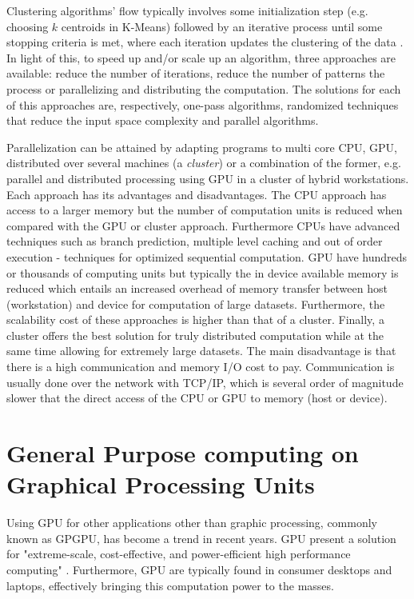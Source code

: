 Clustering algorithms' flow typically involves some initialization step (e.g. choosing $k$ centroids in K-Means) followed by an iterative process until some stopping criteria is met, where each iteration updates the clustering of the data \cite{Aggarwal2014}. In light of this, to speed up and/or scale up an algorithm, three approaches are available: reduce the number of iterations, reduce the number of patterns the process or parallelizing and distributing the computation. The solutions for each of this approaches are, respectively, one-pass algorithms, randomized techniques that reduce the input space complexity and parallel algorithms.

Parallelization can be attained by adapting programs to multi core CPU, GPU, distributed over several machines (a \emph{cluster}) or a combination of the former, e.g. parallel and distributed processing using GPU in a cluster of hybrid workstations.
Each approach has its advantages and disadvantages.
The CPU approach has access to a larger memory but the number of computation units is reduced when compared with the GPU or cluster approach. Furthermore CPUs have advanced techniques such as branch prediction, multiple level caching and out of order execution - techniques for optimized sequential computation.
GPU have hundreds or thousands of computing units but typically the in device available memory is reduced which entails an increased overhead of memory transfer between host (workstation) and device for computation of large datasets.
Furthermore, the scalability cost of these approaches is higher than that of a cluster.
Finally, a cluster offers the best solution for truly distributed computation while at the same time allowing for extremely large datasets. The main disadvantage is that there is a high communication and memory I/O cost to pay. Communication is usually done over the network with TCP/IP, which is several order of magnitude slower that the direct access of the CPU or GPU to memory (host or device).


	

\section{General Purpose computing on Graphical Processing Units}
Using GPU for other applications other than graphic processing, commonly known as GPGPU, has become a trend in recent years. GPU present a solution for "extreme-scale, cost-effective, and power-efficient high performance computing" \cite{Chen2012}. Furthermore, GPU are typically found in consumer desktops and laptops, effectively bringing this computation power to the masses.

